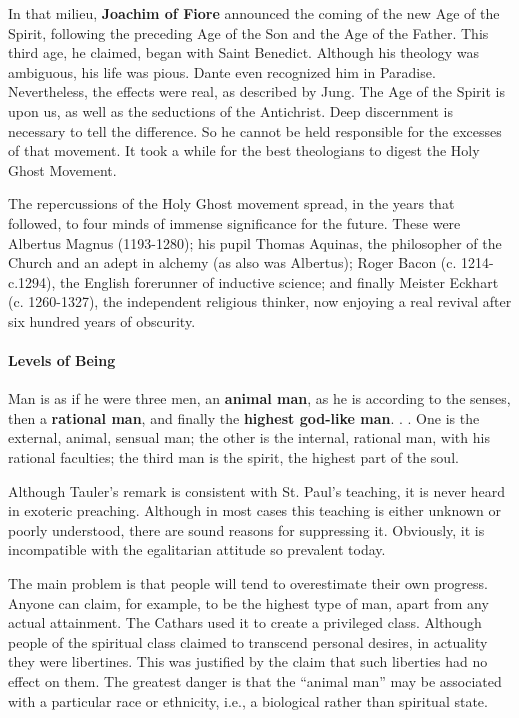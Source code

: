 In that milieu, \textbf{Joachim of Fiore} announced the coming of the new Age of the Spirit, following the preceding Age of the Son and the Age of the Father. This third age, he claimed, began with Saint Benedict. Although his theology was ambiguous, his life was pious. Dante even recognized him in Paradise. Nevertheless, the effects were real, as described by Jung. The Age of the Spirit is upon us, as well as the seductions of the Antichrist. Deep discernment is necessary to tell the difference. So he cannot be held responsible for the excesses of that movement. It took a while for the best theologians to digest the Holy Ghost Movement.

\begin{quotex}
The repercussions of the Holy Ghost movement spread, in the years that followed, to four minds of immense significance for the future. These were Albertus Magnus (1193-1280); his pupil Thomas Aquinas, the philosopher of the Church and an adept in alchemy (as also was Albertus); Roger Bacon (c. 1214-c.1294), the English forerunner of inductive science; and finally Meister Eckhart (c. 1260-1327), the independent religious thinker, now enjoying a real revival after six hundred years of obscurity.
\end{quotex}


\paragraph{Levels of Being}


\begin{quotex}
Man is as if he were three men, an \textbf{animal man}, as he is according to the senses, then a \textbf{rational man}, and finally the \textbf{highest god-like man}. . . One is the external, animal, sensual man; the other is the internal, rational man, with his rational faculties; the third man is the spirit, the highest part of the soul.
\end{quotex}


Although Tauler's remark is consistent with St. Paul's teaching, it is never heard in exoteric preaching. Although in most cases this teaching is either unknown or poorly understood, there are sound reasons for suppressing it. Obviously, it is incompatible with the egalitarian attitude so prevalent today.

The main problem is that people will tend to overestimate their own progress. Anyone can claim, for example, to be the highest type of man, apart from any actual attainment. The Cathars used it to create a privileged class. Although people of the spiritual class claimed to transcend personal desires, in actuality they were libertines. This was justified by the claim that such liberties had no effect on them. The greatest danger is that the ``animal man'' may be associated with a particular race or ethnicity, i.e., a biological rather than spiritual state.

